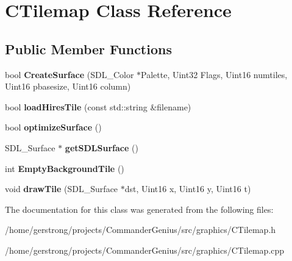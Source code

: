 \hypertarget{class_c_tilemap}{
\section{CTilemap Class Reference}
\label{class_c_tilemap}
}
\subsection*{Public Member Functions}
\begin{DoxyCompactItemize}
\item 
\hypertarget{class_c_tilemap_a480224b699968a965206843c9134250a}{
bool {\bfseries CreateSurface} (SDL\_\-Color $\ast$Palette, Uint32 Flags, Uint16 numtiles, Uint16 pbasesize, Uint16 column)}
\label{class_c_tilemap_a480224b699968a965206843c9134250a}

\item 
\hypertarget{class_c_tilemap_a5be951362e4cd3d2027ab9c562fea599}{
bool {\bfseries loadHiresTile} (const std::string \&filename)}
\label{class_c_tilemap_a5be951362e4cd3d2027ab9c562fea599}

\item 
\hypertarget{class_c_tilemap_afc8fee22a4ad02994c9a2483bee3b19f}{
bool {\bfseries optimizeSurface} ()}
\label{class_c_tilemap_afc8fee22a4ad02994c9a2483bee3b19f}

\item 
\hypertarget{class_c_tilemap_af471723aedb61300fe617bcf68bb2f9c}{
SDL\_\-Surface $\ast$ {\bfseries getSDLSurface} ()}
\label{class_c_tilemap_af471723aedb61300fe617bcf68bb2f9c}

\item 
\hypertarget{class_c_tilemap_af784370c4349dd10d3110ea48b626c25}{
int {\bfseries EmptyBackgroundTile} ()}
\label{class_c_tilemap_af784370c4349dd10d3110ea48b626c25}

\item 
\hypertarget{class_c_tilemap_a6138e0296043042625a4b3fbd8e994d2}{
void {\bfseries drawTile} (SDL\_\-Surface $\ast$dst, Uint16 x, Uint16 y, Uint16 t)}
\label{class_c_tilemap_a6138e0296043042625a4b3fbd8e994d2}

\end{DoxyCompactItemize}


The documentation for this class was generated from the following files:\begin{DoxyCompactItemize}
\item 
/home/gerstrong/projects/CommanderGenius/src/graphics/CTilemap.h\item 
/home/gerstrong/projects/CommanderGenius/src/graphics/CTilemap.cpp\end{DoxyCompactItemize}
